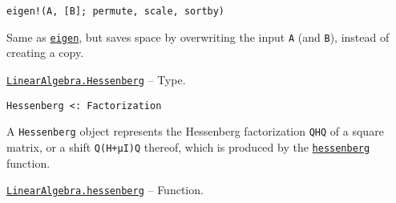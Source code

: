 \begin{adjustwidth}{2em}{0pt}


\begin{verbatim}
eigen!(A, [B]; permute, scale, sortby)
\end{verbatim}

Same as \hyperlink{11056016707394839114}{\texttt{eigen}}, but saves space by overwriting the input \texttt{A} (and \texttt{B}), instead of creating a copy.



\end{adjustwidth}
\hypertarget{17562496283230520715}{} 
\hyperlink{17562496283230520715}{\texttt{LinearAlgebra.Hessenberg}}  -- {Type.}

\begin{adjustwidth}{2em}{0pt}


\begin{verbatim}
Hessenberg <: Factorization
\end{verbatim}

A \texttt{Hessenberg} object represents the Hessenberg factorization \texttt{QHQ{\textquotesingle}} of a square matrix, or a shift \texttt{Q(H+μI)Q{\textquotesingle}} thereof, which is produced by the \hyperlink{14451165250498024497}{\texttt{hessenberg}} function.



\end{adjustwidth}
\hypertarget{14451165250498024497}{} 
\hyperlink{14451165250498024497}{\texttt{LinearAlgebra.hessenberg}}  -- {Function.}


